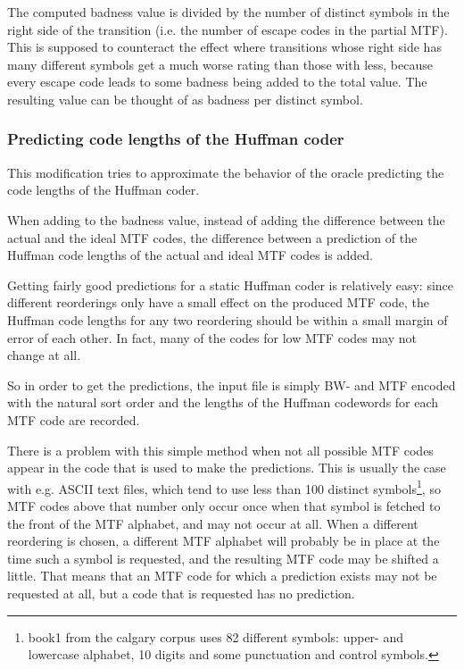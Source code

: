 \documentclass[a4paper]{scrreprt}
\begin{document}
The computed badness value is divided by the number of distinct symbols in the
right side of the transition (i.e. the number of escape codes in the partial
MTF). This is supposed to counteract the effect where transitions whose right
side has many different symbols get a much worse rating than those with less,
because every escape code leads to some badness being added to the total value.
The resulting value can be thought of as badness per distinct symbol.

\subsubsection{Predicting code lengths of the Huffman coder}

This modification tries to approximate the behavior of the oracle predicting the
code lengths of the Huffman coder.

When adding to the badness value, instead of adding the difference between the
actual and the ideal MTF codes, the difference between a prediction of the
Huffman code lengths of the actual and ideal MTF codes is added.

Getting fairly good predictions for a static Huffman coder is relatively easy:
since different reorderings only have a small effect on the produced MTF code,
the Huffman code lengths for any two reordering should be within a small margin
of error of each other. In fact, many of the codes for low MTF codes may not
change at all.

So in order to get the predictions, the input file is simply BW- and MTF encoded
with the natural sort order and the lengths of the Huffman codewords for each
MTF code are recorded.

There is a problem with this simple method when not all possible MTF codes
appear in the code that is used to make the predictions. This is usually the
case with e.g. ASCII text files, which tend to use less than 100 distinct
symbols\footnote{book1 from the calgary corpus uses 82 different symbols:
upper- and lowercase alphabet, 10 digits and some punctuation and control
symbols.}, so MTF codes above that number only occur once when that symbol is
fetched to the front of the MTF alphabet, and may not occur at all.
When a different reordering is chosen, a different MTF alphabet will probably be
in place at the time such a symbol is requested, and the resulting MTF code may
be shifted a little. That means that an MTF code for which a prediction exists
may not be requested at all, but a code that is requested has no prediction.
\end{document}

